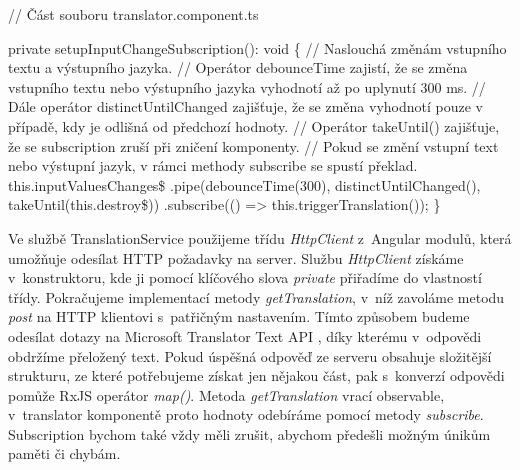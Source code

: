 \begin{prog}
// Část souboru translator.component.ts

private setupInputChangeSubscription(): void \{
  // Naslouchá změnám vstupního textu a výstupního jazyka.
  // Operátor debounceTime zajistí, že se změna vstupního textu 
    nebo výstupního jazyka vyhodnotí až po uplynutí 300 ms.
  // Dále operátor distinctUntilChanged zajišťuje, 
    že se změna vyhodnotí pouze v případě, kdy je odlišná od předchozí hodnoty.
  // Operátor takeUntil() zajišťuje, 
    že se subscription zruší při zničení komponenty.
  // Pokud se změní vstupní text nebo výstupní jazyk, 
    v rámci methody subscribe se spustí překlad.
  this.inputValuesChanges\$
    .pipe(debounceTime(300), distinctUntilChanged(), takeUntil(this.destroy\$))
    .subscribe(() => this.triggerTranslation());
\}
\end{prog}

Ve službě TranslationService použijeme třídu \emph{HttpClient} z~Angular modulů, která umožňuje odesílat HTTP požadavky na server.
Službu \emph{HttpClient} získáme v~konstruktoru, kde ji pomocí klíčového slova \emph{private} přiřadíme do vlastností třídy. 
Pokračujeme implementací metody \emph{getTranslation}, v~níž zavoláme metodu \emph{post} na HTTP klientovi s~patřičným nastavením. 
Tímto způsobem budeme odesílat dotazy na Microsoft Translator Text API \cite{translatortextapi}, díky kterému v~odpovědi obdržíme přeložený text. 
Pokud úspěšná odpověď ze serveru obsahuje složitější strukturu, ze které potřebujeme získat jen nějakou část, pak s~konverzí odpovědi pomůže RxJS operátor \emph{map()}. 
Metoda \emph{getTranslation} vrací observable, v~translator komponentě proto hodnoty odebíráme pomocí metody \emph{subscribe}. 
Subscription bychom také vždy měli zrušit, abychom předešli možným únikům paměti či chybám.

